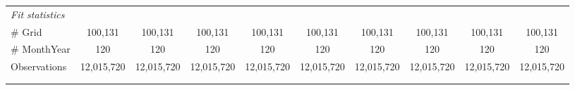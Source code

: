 \begin{table}[htbp]
\begin{tabular}{lccccccccc}
      \midrule
      \emph{Fit statistics}\\
      \# Grid                         & 100,131       & 100,131       & 100,131       & 100,131       & 100,131       & 100,131       & 100,131       & 100,131       & 100,131\\  
      \# MonthYear                    & 120           & 120           & 120           & 120           & 120           & 120           & 120           & 120           & 120\\  
      Observations                    & 12,015,720    & 12,015,720    & 12,015,720    & 12,015,720    & 12,015,720    & 12,015,720    & 12,015,720    & 12,015,720    & 12,015,720\\  
      \midrule \midrule
                                      &               &               &               &               &               &               &               &               &  \tabularnewline 
      \\
   \end{tabular}
\end{table}


